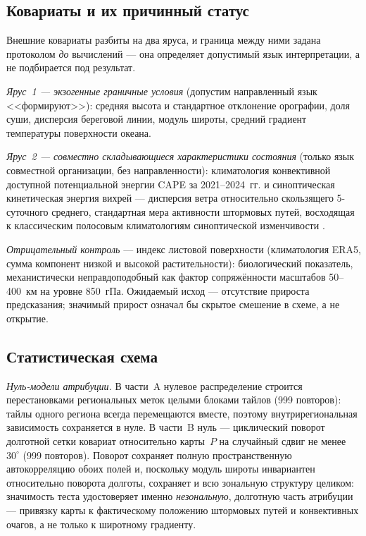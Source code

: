 \documentclass[11pt,a4paper]{article}
\begin{document}
\subsection{Ковариаты и их причинный статус}

Внешние ковариаты разбиты на два яруса, и граница между ними задана протоколом \emph{до} вычислений --- она определяет допустимый язык интерпретации, а не подбирается под результат.

\emph{Ярус~1 --- экзогенные граничные условия} (допустим направленный язык <<формируют>>): средняя высота и стандартное отклонение орографии, доля суши, дисперсия береговой линии, модуль широты, средний градиент температуры поверхности океана.

\emph{Ярус~2 --- совместно складывающиеся характеристики состояния} (только язык совместной организации, без направленности): климатология конвективной доступной потенциальной энергии CAPE за 2021--2024~гг. \cite{RiemannCampe2009} и синоптическая кинетическая энергия вихрей --- дисперсия ветра относительно скользящего 5-суточного среднего, стандартная мера активности штормовых путей, восходящая к классическим полосовым климатологиям синоптической изменчивости \cite{Blackmon1976,HoskinsHodges2019}.

\emph{Отрицательный контроль} --- индекс листовой поверхности (климатология ERA5, сумма компонент низкой и высокой растительности): биологический показатель, механистически неправдоподобный как фактор сопряжённости масштабов 50--400~км на уровне 850~гПа. Ожидаемый исход --- отсутствие прироста предсказания; значимый прирост означал бы скрытое смешение в схеме, а не открытие.

\subsection{Статистическая схема}

\emph{Нуль-модели атрибуции.} В части~A нулевое распределение строится перестановками региональных меток целыми блоками тайлов (999 повторов): тайлы одного региона всегда перемещаются вместе, поэтому внутрирегиональная зависимость сохраняется в нуле. В части~B нуль --- циклический поворот долготной сетки ковариат относительно карты~$P$ на случайный сдвиг не менее $30^\circ$ (999 повторов). Поворот сохраняет полную пространственную автокорреляцию обоих полей и, поскольку модуль широты инвариантен относительно поворота долготы, сохраняет и всю зональную структуру целиком: значимость теста удостоверяет именно \emph{незональную}, долготную часть атрибуции --- привязку карты к фактическому положению штормовых путей и конвективных очагов, а не только к широтному градиенту.
\end{document}
